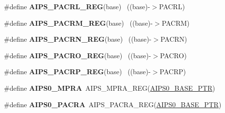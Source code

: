 \begin{DoxyCompactItemize}
\item 
\hypertarget{group___a_i_p_s___register___accessor___macros_ga9f0835d43f92a09467da7cae7f5a602f}{}\#define {\bfseries A\+I\+P\+S\+\_\+\+P\+A\+C\+R\+L\+\_\+\+R\+E\+G}(base)                                      ~((base)-\/$>$P\+A\+C\+R\+L)\label{group___a_i_p_s___register___accessor___macros_ga9f0835d43f92a09467da7cae7f5a602f}

\item 
\hypertarget{group___a_i_p_s___register___accessor___macros_ga85c559319333d83c01a7dcea1ac14bad}{}\#define {\bfseries A\+I\+P\+S\+\_\+\+P\+A\+C\+R\+M\+\_\+\+R\+E\+G}(base)                                      ~((base)-\/$>$P\+A\+C\+R\+M)\label{group___a_i_p_s___register___accessor___macros_ga85c559319333d83c01a7dcea1ac14bad}

\item 
\hypertarget{group___a_i_p_s___register___accessor___macros_gaa794b17b9de6a81bd01fc3bdeeafc5b2}{}\#define {\bfseries A\+I\+P\+S\+\_\+\+P\+A\+C\+R\+N\+\_\+\+R\+E\+G}(base)                                      ~((base)-\/$>$P\+A\+C\+R\+N)\label{group___a_i_p_s___register___accessor___macros_gaa794b17b9de6a81bd01fc3bdeeafc5b2}

\item 
\hypertarget{group___a_i_p_s___register___accessor___macros_ga41ac26d457af78568e03b65f4ed71c71}{}\#define {\bfseries A\+I\+P\+S\+\_\+\+P\+A\+C\+R\+O\+\_\+\+R\+E\+G}(base)                                      ~((base)-\/$>$P\+A\+C\+R\+O)\label{group___a_i_p_s___register___accessor___macros_ga41ac26d457af78568e03b65f4ed71c71}

\item 
\hypertarget{group___a_i_p_s___register___accessor___macros_gadf1bac253f22b305685fdd87564a7660}{}\#define {\bfseries A\+I\+P\+S\+\_\+\+P\+A\+C\+R\+P\+\_\+\+R\+E\+G}(base)                                      ~((base)-\/$>$P\+A\+C\+R\+P)\label{group___a_i_p_s___register___accessor___macros_gadf1bac253f22b305685fdd87564a7660}

\item 
\hypertarget{group___a_i_p_s___register___accessor___macros_ga41bb0ce77a71c841504362985bac06d6}{}\#define {\bfseries A\+I\+P\+S0\+\_\+\+M\+P\+R\+A}~A\+I\+P\+S\+\_\+\+M\+P\+R\+A\+\_\+\+R\+E\+G(\hyperlink{group___a_i_p_s___peripheral_ga6affb22d1dff0d01c843913f33f1c1a9}{A\+I\+P\+S0\+\_\+\+B\+A\+S\+E\+\_\+\+P\+T\+R})\label{group___a_i_p_s___register___accessor___macros_ga41bb0ce77a71c841504362985bac06d6}

\item 
\hypertarget{group___a_i_p_s___register___accessor___macros_ga6567afc8512229ae0e8fa1c13de5e80d}{}\#define {\bfseries A\+I\+P\+S0\+\_\+\+P\+A\+C\+R\+A}~A\+I\+P\+S\+\_\+\+P\+A\+C\+R\+A\+\_\+\+R\+E\+G(\hyperlink{group___a_i_p_s___peripheral_ga6affb22d1dff0d01c843913f33f1c1a9}{A\+I\+P\+S0\+\_\+\+B\+A\+S\+E\+\_\+\+P\+T\+R})\label{group___a_i_p_s___register___accessor___macros_ga6567afc8512229ae0e8fa1c13de5e80d}


\end{DoxyCompactItemize}
